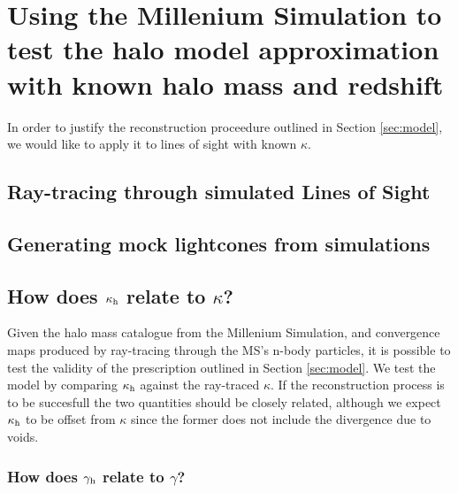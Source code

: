 \documentclass[useAMS,usenatbib]{mn2e}
\begin{document}


\section{Using the Millenium Simulation to test the halo model approximation with known halo mass and redshift}
\label{sec:knownMh+z} 

In order to justify the reconstruction proceedure outlined in Section \ref{sec:model}, we would like to apply it to lines of sight with known $\kappa$. 


\subsection{Ray-tracing through simulated Lines of Sight}
\label{subsec:raytracing}

\subsection{Generating mock lightcones from simulations}

\subsection{How does $\kappa_{\rm h}$ relate to $\kappa$?}
Given the halo mass catalogue from the Millenium Simulation, 
and convergence maps produced by ray-tracing through the MS's n-body particles, 
it is possible to test the validity of the prescription outlined
 in Section \ref{sec:model}. We test the model by comparing $\kappa_{\rm h}$ against
 the ray-traced $\kappa$. If the reconstruction process is to be
 succesfull the two quantities should be closely related, although we expect $\kappa_{\rm h}$ to be offset from $\kappa$ since the former does not include the divergence due to voids.


\subsubsection{How does $\gamma_{\rm h}$ relate to $\gamma$?}
\end{document}
